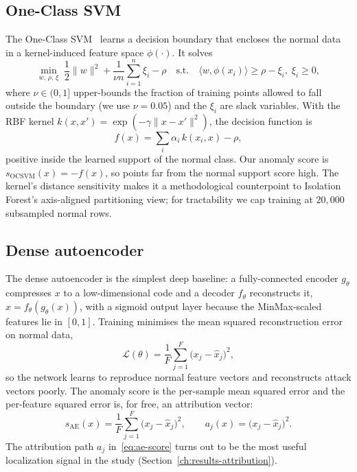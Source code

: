 \subsection{One-Class SVM}
\label{sec:det-ocsvm}

The One-Class SVM~\cite{scholkopf2001estimating} learns a decision boundary that encloses the normal data in a kernel-induced feature space $\phi(\cdot)$.  It solves
\begin{equation}
  \min_{w,\,\rho,\,\xi}\; \frac{1}{2}\lVert w \rVert^{2} + \frac{1}{\nu n}\sum_{i=1}^{n}\xi_i - \rho
  \quad \text{s.t.}\quad \langle w, \phi(x_i)\rangle \geq \rho - \xi_i,\; \xi_i \geq 0,
\end{equation}
where $\nu \in (0,1]$ upper-bounds the fraction of training points allowed to fall outside the boundary (we use $\nu = 0.05$) and the $\xi_i$ are slack variables.  With the RBF kernel $k(x,x') = \exp(-\gamma \lVert x - x' \rVert^{2})$, the decision function is
\begin{equation}
  f(x) = \sum_{i} \alpha_i\, k(x_i, x) - \rho,
\end{equation}
positive inside the learned support of the normal class.  Our anomaly score is $s_{\mathrm{OCSVM}}(x) = -f(x)$, so points far from the normal support score high.  The kernel's distance sensitivity makes it a methodological counterpoint to Isolation Forest's axis-aligned partitioning view; for tractability we cap training at $20{,}000$ subsampled normal rows.

\subsection{Dense autoencoder}
\label{sec:det-dense}

The dense autoencoder is the simplest deep baseline: a fully-connected encoder $g_\theta$ compresses $x$ to a low-dimensional code and a decoder $f_\theta$ reconstructs it, $\hat{x} = f_\theta(g_\theta(x))$, with a sigmoid output layer because the MinMax-scaled features lie in $[0,1]$.  Training minimises the mean squared reconstruction error on normal data,
\begin{equation}
  \mathcal{L}(\theta) = \frac{1}{F}\sum_{j=1}^{F}\bigl(x_j - \hat{x}_j\bigr)^{2},
\end{equation}
so the network learns to reproduce normal feature vectors and reconstructs attack vectors poorly.  The anomaly score is the per-sample mean squared error and the per-feature squared error is, for free, an attribution vector:
\begin{equation}
  s_{\mathrm{AE}}(x) = \frac{1}{F}\sum_{j=1}^{F}\bigl(x_j - \hat{x}_j\bigr)^{2},
  \qquad
  a_j(x) = \bigl(x_j - \hat{x}_j\bigr)^{2}.
  \label{eq:ae-score}
\end{equation}
The attribution path $a_j$ in~\eqref{eq:ae-score} turns out to be the most useful localization signal in the study (Section~\ref{ch:results-attribution}).

